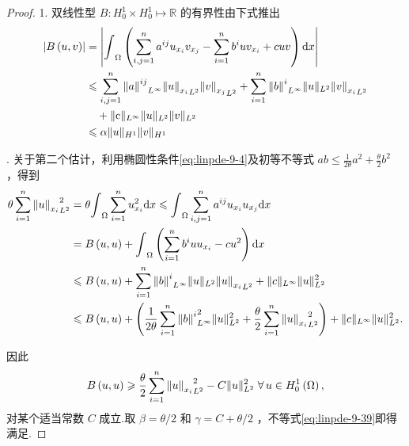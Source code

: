 \begin{proof}
1. 双线性型 $B : {H}_{0}^{1} \times  {H}_{0}^{1} \mapsto  \mathbb{R}$ 的有界性由下式推出
{\setjot[-2]\begin{align*}
    \left| {B\left(  {u,v}\right)  }\right|  &= \left| {{\int }_{\Omega }\left( {\sum_{{i,j = 1}}^{n}{a}^{ij}{u}_{{x}_{i}}{v}_{{x}_{j}} - \sum_{{i = 1}}^{n}{b}^{i}u{v}_{{x}_{i}} + {cuv}}\right) {\mathop{}\!\mathrm{d} x}}\right|\\
    &\leqslant  \sum_{{i,j = 1}}^{n}{\norm{a}^{ij}}_{{L}^{\infty }}{\norm{u}_{{x}_{i}}}_{{L}^{2}}{\norm{v}_{{x}_{j}}}_{{L}^{2}} + \sum_{{i = 1}}^{n}{\norm{b}^{i}}_{{L}^{\infty }}\| u{\| }_{{L}^{2}}{\norm{v}_{{x}_{i}}}_{{L}^{2}}\\
    &\quad + \| \mathrm{c}{\| }_{{L}^{\infty }}\| u{\| }_{{L}^{2}}\| v{\| }_{{L}^{2}}\\
    &\leqslant  \alpha \| u{\| }_{{H}^{1}}\| v{\| }_{{H}^{1}}
\end{align*}}

. 关于第二个估计，利用椭圆性条件\eqref{eq:linpde-9-4}及初等不等式 ${ab} \leq  \frac{1}{2\theta }{a}^{2} + \frac{\theta }{2}{b}^{2}$ ，得到
{\setjot[-2]\begin{align*}
    \theta \sum_{{i = 1}}^{n}{\norm{u}_{{x}_{i}}}_{{L}^{2}}^{2} &= \theta {\int }_{\Omega }\sum_{{i = 1}}^{n}{u}_{{x}_{i}}^{2}{\mathop{}\!\mathrm{d} x} \leqslant  {\int }_{\Omega }\sum_{{i,j = 1}}^{n}{a}^{ij}{u}_{{x}_{i}}{u}_{{x}_{j}}{\mathop{}\!\mathrm{d} x}\\
    &= B\left(  {u,u}\right)   + {\int }_{\Omega }\left( {\sum_{{i = 1}}^{n}{b}^{i}u{u}_{{x}_{i}} - c{u}^{2}}\right) {\mathop{}\!\mathrm{d} x}\\
    &\leqslant  B\left(  {u,u}\right)   + \sum_{{i = 1}}^{n}{\norm{b}^{i}}_{{L}^{\infty }}\| u{\| }_{{L}^{2}}{\norm{u}_{{x}_{i}}}_{{L}^{2}} + \| c{\| }_{{L}^{\infty }}\| u{\| }_{{L}^{2}}^{2}\\
    &\leqslant  B\left(  {u,u}\right)   + \left( {\frac{1}{2\theta }\sum_{{i = 1}}^{n}{\norm{b}^{i}}_{{L}^{\infty }}^{2}\| u{\| }_{{L}^{2}}^{2} + \frac{\theta }{2}\sum_{{i = 1}}^{n}{\norm{u}_{{x}_{i}}}_{{L}^{2}}^{2}}\right)  + \| c{\| }_{{L}^{\infty }}\| u{\| }_{{L}^{2}}^{2}.
\end{align*}}

因此
\[
B\left(  {u,u}\right)   \geqslant  \frac{\theta }{2}\sum_{{i = 1}}^{n}{\norm{u}_{{x}_{i}}}_{{L}^{2}}^{2} - C\| u{\| }_{{L}^{2}}^{2}\;\forall\,u \in  {H}_{0}^{1}\left( \Omega \right) ,
\]
对某个适当常数 $C$ 成立.取 $\beta  = \theta /2$ 和 $\gamma  = C + \theta /2$ ，不等式\eqref{eq:linpde-9-39}即得满足.
\end{proof}

